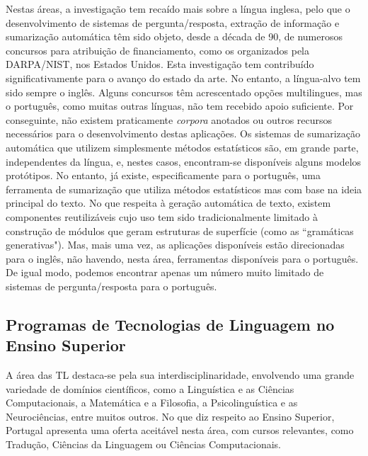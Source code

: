 \documentclass[]{../metanetpaper}
\begin{document}
\begin{multicols}{2}
Nestas áreas, a investigação tem recaído mais sobre a língua inglesa, pelo que o desenvolvimento de sistemas de pergunta/resposta, extração de informação e sumarização automática têm sido objeto, desde a década de 90, de numerosos concursos para atribuição de financiamento, como os organizados pela DARPA/NIST, nos Estados Unidos. Esta investigação tem contribuído significativamente para o avanço do estado da arte. No entanto, a língua-alvo tem sido sempre o inglês. Alguns concursos têm acrescentado opções multilingues, mas o português, como muitas outras línguas, não tem recebido apoio suficiente. Por conseguinte, não existem praticamente \textit{corpora} anotados ou outros recursos necessários para o desenvolvimento destas aplicações. Os sistemas de sumarização automática que utilizem simplesmente métodos estatísticos são, em grande parte, independentes da língua, e, nestes casos, encontram-se disponíveis alguns modelos protótipos. No entanto, já existe, especificamente para o português, uma ferramenta de sumarização que utiliza métodos estatísticos mas com base na ideia principal do texto. No que respeita à geração automática de texto, existem componentes reutilizáveis cujo uso tem sido tradicionalmente limitado à construção de módulos que geram estruturas de superfície (como as “gramáticas generativas"). Mas, mais uma vez, as aplicações disponíveis estão direcionadas para o inglês, não havendo, nesta área, ferramentas disponíveis para o português. De igual modo, podemos encontrar apenas um número muito limitado de sistemas de pergunta/resposta para o português.

\subsection{Programas de Tecnologias de Linguagem no Ensino Superior}

A área das TL destaca-se pela sua interdisciplinaridade, envolvendo uma grande variedade de domínios científicos, como a Linguística e as Ciências Computacionais, a Matemática e a Filosofia, a Psicolinguística e as Neurociências, entre muitos outros. No que diz respeito ao Ensino Superior, Portugal apresenta uma oferta aceitável nesta área, com cursos relevantes, como Tradução, Ciências da Linguagem ou Ciências Computacionais.


\end{multicols}
\end{document}
